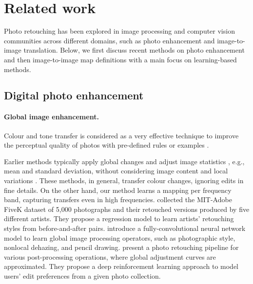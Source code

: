 \section{Related work}

Photo retouching has been explored in image processing and computer vision communities across different domains, such as photo enhancement and image-to-image translation. Below, we first discuss recent methods on photo enhancement and then image-to-image map definitions with a main focus on learning-based methods.

\subsection{Digital photo enhancement}
\paragraph{Global image enhancement.} Colour and tone transfer is considered as a very effective technique to improve the perceptual quality of photos with pre-defined rules or examples \cite{Faridul14ASurvey, mustafa2022distilling}.

Earlier methods typically apply global changes and adjust image statistics \cite{Bychkovsky11Learning, Bae06Two, Pitie05NDimensional, Pitie07Automated, Reinhard01Color, Sunkavalli10Multi, he2020conditional, park2018distort}, e.g., mean and standard deviation, without considering image content and local variations \cite{CohenOr06Color}. These methods, in general, transfer colour changes, ignoring edits in fine details. On the other hand, our method learns a mapping per frequency band, capturing transfers even in high frequencies. \citeauthor{Bychkovsky11Learning} \cite{Bychkovsky11Learning} collected the MIT-Adobe FiveK dataset of 5,000 photographs and their retouched versions produced by five different artists. They propose a regression model to learn artists' retouching styles from before-and-after pairs. \citeauthor{chen2017fast} \cite{chen2017fast} introduce a fully-convolutional neural network model to learn global image processing operators, such as photographic style, nonlocal dehazing, and pencil drawing. \citeauthor{Hu18Exposure} \cite{Hu18Exposure} present a photo retouching pipeline for various post-processing operations, where global adjustment curves are approximated. They propose a deep reinforcement learning approach to model users' edit preferences from a given photo collection.
 
